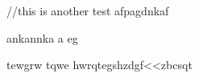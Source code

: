     //this is another test
    afpagdnkaf

    ankannka
    a
    eg

    tewgrw
    tqwe
    hwrqtegshzdgf<<zbcsqt
    